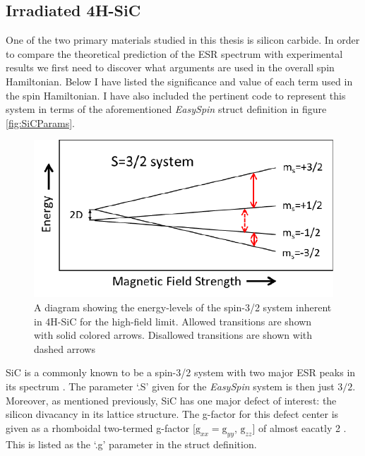 \documentclass[oneside, noacknowlegments]{BYUPhys}
\begin{document}
\subsection{Irradiated 4H-SiC}

One of the two primary materials studied in this thesis is silicon carbide. In order to compare the theoretical prediction of the ESR spectrum with experimental results we first need to discover what arguments are used in the overall spin Hamiltonian. Below I have listed the significance and value of each term used in the spin Hamiltonian. I have also included the pertinent code to represent this system in terms of the aforementioned \textit{EasySpin} struct definition in figure \ref{fig:SiCParams}.

\begin{figure}
    \centerline{\includegraphics{energy_levels_fig}}
    \caption[Energy Levels of 4H-SiC]{\label{fig:MFRelationship}
     A diagram showing the energy-levels of the spin-3/2 system inherent in 4H-SiC for the high-field limit. Allowed transitions are shown with solid colored arrows. Disallowed transitions are shown with dashed arrows}
 \end{figure}

SiC is a commonly known to be a spin-3/2 system with two major ESR peaks in its spectrum \cite{RefWorks:doc:5892964ee4b0499fa95c5108}. The parameter `.S' given for the \textit{EasySpin} system is then just $3/2$. Moreover, as mentioned previously, SiC has one major defect of interest: the silicon divacancy \cite{RefWorks:doc:58929800e4b0499fa95c51a1} \cite{RefWorks:doc:589297a9e4b0d4c09201f736} in its lattice structure. The g-factor for this defect center is given as a rhomboidal two-termed g-factor [$\text{g}_{xx}=\text{g}_{yy}$, $\text{g}_{zz}$] of almost eacatly 2 \cite{RefWorks:doc:5892964ee4b0499fa95c5108}. This is listed as the `.g' parameter in the struct definition.
\end{document}
